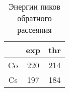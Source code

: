 \begin{table}[h!]
    \centering
    \begin{tabular}{|c|c|c|}
    \hline
       & exp & thr \\ \hline
    Co & 220 & 214 \\ \hline
    Cs & 197 & 184 \\ \hline
    \end{tabular}
    \caption{Энергии пиков обратного рассеяния}
    \label{tab:back_f}
\end{table}